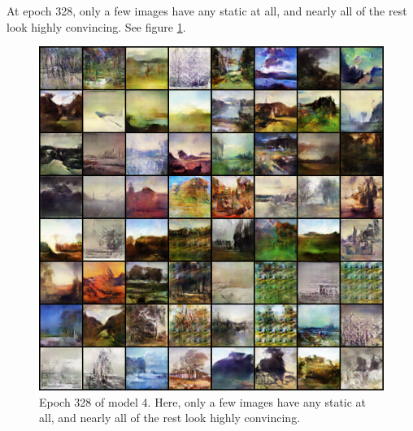 \documentclass[11pt,letterpaper]{article}
\begin{document}
				At epoch 328, only a few images have any static at all, and nearly all of the rest look highly convincing.
				See figure \ref{fig:wa64:epoch328generator}.
				\begin{figure}
					\centering
					\includegraphics[width=1.0\linewidth]{results/model4/epoch328_generator}
					\caption{Epoch 328 of model 4. Here, only a few images have any static at all, and nearly all of the rest look highly convincing.}
					\label{fig:wa64:epoch328generator}
				\end{figure}
\end{document}
